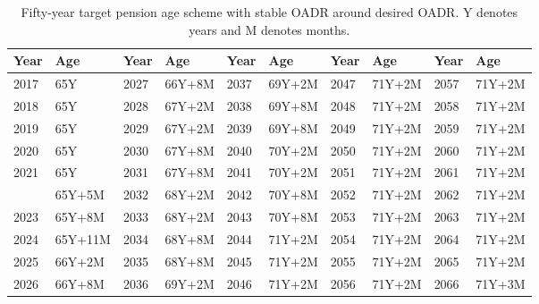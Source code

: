 \documentclass[11pt,a4paper,]{article}
\begin{document}
\begin{table}

\caption{\label{tab:pensionagetables}Fifty-year target pension age scheme with stable OADR around desired OADR. Y denotes years and M denotes months.}
\centering
\begin{tabular}[t]{llllllllll}
\toprule
Year & Age & Year & Age & Year & Age & Year & Age & Year & Age\\
\midrule
2017 & 65Y & 2027 & 66Y+8M & 2037 & 69Y+2M & 2047 & 71Y+2M & 2057 & 71Y+2M\\
2018 & 65Y & 2028 & 67Y+2M & 2038 & 69Y+8M & 2048 & 71Y+2M & 2058 & 71Y+2M\\
2019 & 65Y & 2029 & 67Y+2M & 2039 & 69Y+8M & 2049 & 71Y+2M & 2059 & 71Y+2M\\
2020 & 65Y & 2030 & 67Y+8M & 2040 & 70Y+2M & 2050 & 71Y+2M & 2060 & 71Y+2M\\
2021 & 65Y & 2031 & 67Y+8M & 2041 & 70Y+2M & 2051 & 71Y+2M & 2061 & 71Y+2M\\
\addlinespace
2022 & 65Y+5M & 2032 & 68Y+2M & 2042 & 70Y+8M & 2052 & 71Y+2M & 2062 & 71Y+2M\\
2023 & 65Y+8M & 2033 & 68Y+2M & 2043 & 70Y+8M & 2053 & 71Y+2M & 2063 & 71Y+2M\\
2024 & 65Y+11M & 2034 & 68Y+8M & 2044 & 71Y+2M & 2054 & 71Y+2M & 2064 & 71Y+2M\\
2025 & 66Y+2M & 2035 & 68Y+8M & 2045 & 71Y+2M & 2055 & 71Y+2M & 2065 & 71Y+2M\\
2026 & 66Y+8M & 2036 & 69Y+2M & 2046 & 71Y+2M & 2056 & 71Y+2M & 2066 & 71Y+3M\\
\bottomrule
\end{tabular}
\end{table}
\end{document}
